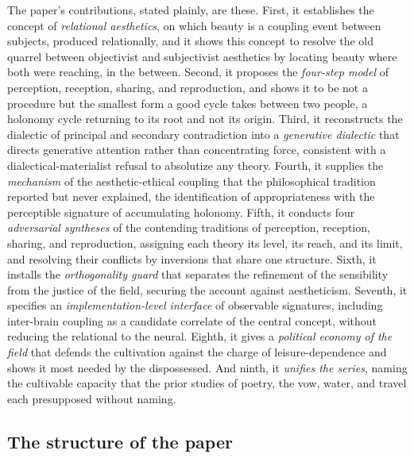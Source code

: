 The paper's contributions, stated plainly, are these. First, it establishes the concept of \emph{relational aesthetics}, on which beauty is a coupling event between subjects, produced relationally, and it shows this concept to resolve the old quarrel between objectivist and subjectivist aesthetics by locating beauty where both were reaching, in the between. Second, it proposes the \emph{four-step model} of perception, reception, sharing, and reproduction, and shows it to be not a procedure but the smallest form a good cycle takes between two people, a holonomy cycle returning to its root and not its origin. Third, it reconstructs the dialectic of principal and secondary contradiction into a \emph{generative dialectic} that directs generative attention rather than concentrating force, consistent with a dialectical-materialist refusal to absolutize any theory. Fourth, it supplies the \emph{mechanism} of the aesthetic-ethical coupling that the philosophical tradition reported but never explained, the identification of appropriateness with the perceptible signature of accumulating holonomy. Fifth, it conducts four \emph{adversarial syntheses} of the contending traditions of perception, reception, sharing, and reproduction, assigning each theory its level, its reach, and its limit, and resolving their conflicts by inversions that share one structure. Sixth, it installs the \emph{orthogonality guard} that separates the refinement of the sensibility from the justice of the field, securing the account against aestheticism. Seventh, it specifies an \emph{implementation-level interface} of observable signatures, including inter-brain coupling as a candidate correlate of the central concept, without reducing the relational to the neural. Eighth, it gives a \emph{political economy of the field} that defends the cultivation against the charge of leisure-dependence and shows it most needed by the dispossessed. And ninth, it \emph{unifies the series}, naming the cultivable capacity that the prior studies of poetry, the vow, water, and travel each presupposed without naming.

\subsection{The structure of the paper}
\label{p22:sub:contrib-structure}

